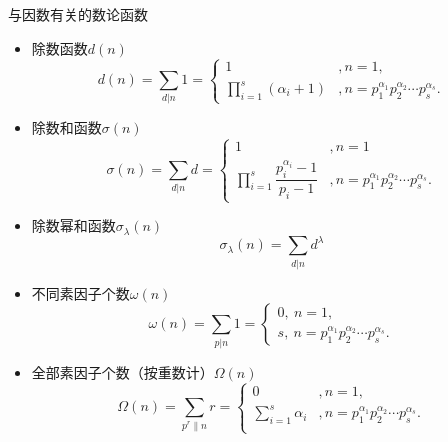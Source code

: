 \begin{example}{与因数有关的数论函数}
\begin{itemize}
\item 除数函数$d(n)$
\begin{equation}
d(n)=\sum_{d|n} 1=
\begin{cases}
1&,n=1,\\
\prod\limits_{i=1}^{s}(\alpha_i+1)&,n=p_1^{\alpha_1}p_2^{\alpha_2}\cdots p_s^{\alpha_s}.
\end{cases}
\end{equation}
\item 除数和函数$\sigma(n)$
\begin{equation}
\sigma(n)=\sum_{d|n}d=
\begin{cases}
1&,n=1\\
\prod\limits_{i=1}^{s}\dfrac{p_i^{\alpha_i}-1}{p_i-1}&,n=p_1^{\alpha_1}p_2^{\alpha_2}\cdots p_s^{\alpha_s}.
\end{cases}
\end{equation}
\item 除数幂和函数$\sigma_\lambda(n)$
\begin{equation}
\sigma_\lambda(n)=\sum_{d|n}d^\lambda
\end{equation}
\item 不同素因子个数$\omega(n)$
\begin{equation}
\omega(n)=\sum_{p|n}1=
\begin{cases}
0,\ n=1,\\
s,\ n=p_1^{\alpha_1}p_2^{\alpha_2}\cdots p_s^{\alpha_s}.
\end{cases}
\end{equation}
\item 全部素因子个数（按重数计）$\Omega(n)$
\begin{equation}
\Omega(n)=\sum_{p^r\|n}r=
\begin{cases}
0&,n=1,\\
\sum\limits_{i=1}^{s}\alpha_i&,n=p_1^{\alpha_1}p_2^{\alpha_2}\cdots p_s^{\alpha_s}.\\
\end{cases}
\end{equation}
\end{itemize}
\end{example}
